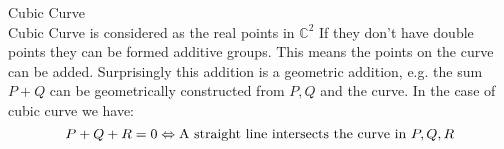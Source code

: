 \documentclass{article}
\begin{document}
Cubic Curve\\
Cubic Curve is considered as the real points in $\mathbb{C}^{2}$
If they don't have double points they can be formed additive groups.
This means the points on the curve can be added. Surprisingly this addition is a geometric addition,
e.g. the sum $P + Q$ can be geometrically constructed from $P, Q$ and the curve.
In the case of cubic curve we have:
\[ 
    P + Q + R = 0  \\
    \Leftrightarrow \text{A straight line intersects the curve in } P, Q, R
\] 
\end{document}
